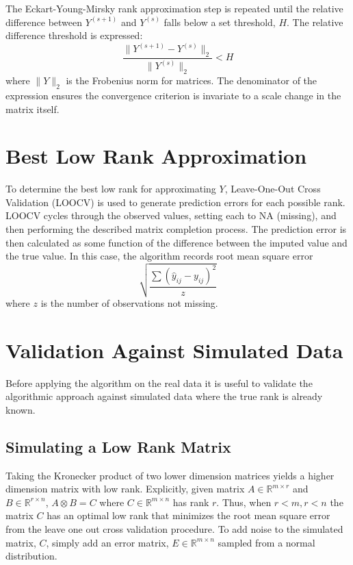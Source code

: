 \documentclass[12pt,twoside]{dukestatscithesis}
\theoremstyle{definition}
\theoremstyle{definition}
\theoremstyle{definition}
\theoremstyle{remark}
\begin{document}
The Eckart-Young-Mirsky rank approximation step is repeated until the
relative difference between \(Y^{(s+1)}\) and \(Y^{(s)}\) falls below a
set threshold, \(H\). The relative difference threshold is expressed:
\[\frac{\|Y^{(s+1)}-Y^{(s)}\|_2}{\|Y^{(s)}\|_2} < H\] where \(\|Y\|_2\)
is the Frobenius norm for matrices. The denominator of the expression
ensures the convergence criterion is invariate to a scale change in the
matrix itself.

\section{Best Low Rank Approximation}\label{best-low-rank-approximation}

To determine the best low rank for approximating \(Y\), Leave-One-Out
Cross Validation (LOOCV) is used to generate prediction errors for each
possible rank. LOOCV cycles through the observed values, setting each to
NA (missing), and then performing the described matrix completion
process. The prediction error is then calculated as some function of the
difference between the imputed value and the true value. In this case,
the algorithm records root mean square error
\[\sqrt{\frac{\sum (\hat y_{ij} - y_{ij})^2}{z}}\] where \(z\) is the
number of observations not missing.

\section{Validation Against Simulated
Data}\label{validation-against-simulated-data}

Before applying the algorithm on the real data it is useful to validate
the algorithmic approach against simulated data where the true rank is
already known.

\subsection{Simulating a Low Rank
Matrix}\label{simulating-a-low-rank-matrix}

Taking the Kronecker product of two lower dimension matrices yields a
higher dimension matrix with low rank. Explicitly, given matrix
\(A \in \mathbb{R}^{m \times r}\) and \(B \in \mathbb{R}^{r \times n}\),
\(A \otimes B = C\) where \(C \in \mathbb{R}^{m \times n}\) has rank
\(r\). Thus, when \(r < m, r < n\) the matrix \(C\) has an optimal low
rank that minimizes the root mean square error from the leave one out
cross validation procedure. To add noise to the simulated matrix, \(C\),
simply add an error matrix, \(E \in \mathbb{R}^{m \times n}\) sampled
from a normal distribution.
\end{document}
